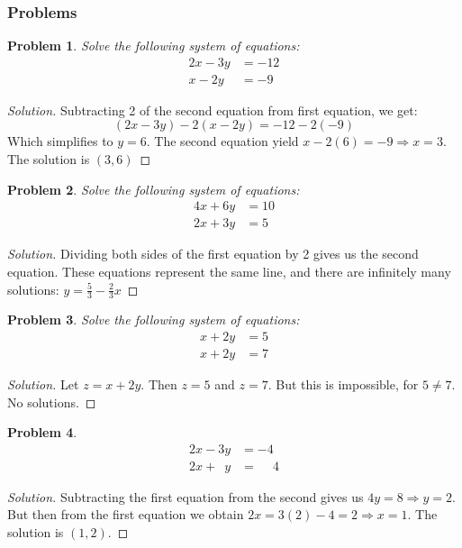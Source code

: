 \documentclass[oneside]{book}
\theoremstyle{mystyle}
\newtheorem{problem}{Problem}[section]
\begin{document}
\subsubsection{Problems}
\begin{problem}
Solve the following system of equations:
\begin{align*}
    2x-3y &= -12\\
    x-2y &= -9
\end{align*}
\end{problem}
\begin{proof}[Solution]
Subtracting 2 of the second equation from first equation, we get:
\begin{equation*}
    (2x-3y)-2(x-2y) = -12 - 2(-9)
\end{equation*}
Which simplifies to $y = 6$. The second equation yield $x -2(6) = -9\Rightarrow x = 3$. The solution is $(3,6)$
\end{proof}
\begin{problem}
Solve the following system of equations:
\begin{align*}
    4x+6y &= 10\\
    2x+3y &= 5
\end{align*}
\end{problem}
\begin{proof}[Solution]
Dividing both sides of the first equation by 2 gives us the second equation. These equations represent the same line, and there are infinitely many solutions: $y = \frac{5}{3} - \frac{2}{3}x$
\end{proof}
\begin{problem}
Solve the following system of equations:
\begin{align*}
    x+2y &= 5\\
    x+2y &= 7
\end{align*}
\end{problem}
\begin{proof}[Solution]
Let $z=x+2y$. Then $z=5$ and $z=7$. But this is impossible, for $5\ne 7$. No solutions.
\end{proof}
\begin{problem}
\begin{align*}
    2x-3y &= -4\\
    2x+\phantom{3}y &= \phantom{-}4
\end{align*}
\end{problem}
\begin{proof}[Solution]
Subtracting the first equation from the second gives us $4y = 8\Rightarrow y=2$. But then from the first equation we obtain $2x=3(2)-4 = 2\Rightarrow x=1$. The solution is $(1,2)$.
\end{proof}
\end{document}
